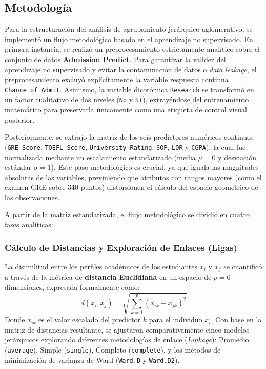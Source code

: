 \documentclass[
  10pt,
  a4paper]{article}
\begin{document}
\subsection{Metodología}\label{metodologuxeda}

Para la estructuración del análisis de agrupamiento jerárquico aglomerativo, se implementó un flujo metodológico basado en el aprendizaje no supervisado. En primera instancia, se realizó un preprocesamiento estrictamente analítico sobre el conjunto de datos \textbf{Admission Predict}. Para garantizar la validez del aprendizaje no supervisado y evitar la contaminación de datos o \emph{data leakage}, el preprocesamiento excluyó explícitamente la variable respuesta continua \texttt{Chance\ of\ Admit}. Asimismo, la variable dicotómica \texttt{Research} se transformó en un factor cualitativo de dos niveles (\texttt{No} y \texttt{Sí}), extrayéndose del entrenamiento matemático para preservarla únicamente como una etiqueta de control visual posterior.

Posteriormente, se extrajo la matriz de los seis predictores numéricos continuos (\texttt{GRE\ Score}, \texttt{TOEFL\ Score}, \texttt{University\ Rating}, \texttt{SOP}, \texttt{LOR} y \texttt{CGPA}), la cual fue normalizada mediante un escalamiento estandarizado (media \(\mu = 0\) y desviación estándar \(\sigma = 1\)). Este paso metodológico es crucial, ya que iguala las magnitudes absolutas de las variables, previniendo que atributos con rangos mayores (como el examen GRE sobre 340 puntos) distorsionen el cálculo del espacio geométrico de las observaciones.

A partir de la matriz estandarizada, el flujo metodológico se dividió en cuatro fases analíticas:

\subsubsection{Cálculo de Distancias y Exploración de Enlaces (Ligas)}\label{cuxe1lculo-de-distancias-y-exploraciuxf3n-de-enlaces-ligas}

La disimilitud entre los perfiles académicos de los estudiantes \(x_i\) y \(x_j\) se cuantificó a través de la métrica de \textbf{distancia Euclidiana} en un espacio de \(p=6\) dimensiones, expresada formalmente como:
\begin{equation}
    d(x_i, x_j) = \sqrt{\sum_{k=1}^{p} (x_{ik} - x_{jk})^2}
\end{equation}
Donde \(x_{ik}\) es el valor escalado del predictor \(k\) para el individuo \(x_i\). Con base en la matriz de distancias resultante, se ajustaron comparativamente cinco modelos jerárquicos explorando diferentes metodologías de enlace (\emph{Linkage}): Promedio (\texttt{average}), Simple (\texttt{single}), Completo (\texttt{complete}), y los métodos de minimización de varianza de Ward (\texttt{Ward.D} y \texttt{Ward.D2}).
\end{document}

